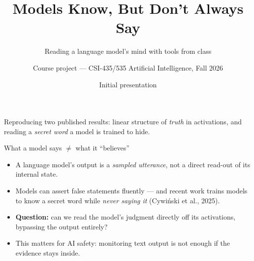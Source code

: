 \documentclass[aspectratio=169,10pt]{beamer}
\title[Models Know, But Don't Always Say]{Models Know, But Don't Always Say}
\subtitle{Reading a language model's mind with tools from class}
\author{Course project --- CSI-435/535 Artificial Intelligence, Fall 2026}
\date{Initial presentation}
\begin{document}
\begin{frame}
  \titlepage
  \begin{center}
    \small Reproducing two published results: linear structure of \emph{truth} in
    activations, and reading a \emph{secret word} a model is trained to hide.
  \end{center}
\end{frame}

\begin{frame}{What a model says $\neq$ what it ``believes''}
  \begin{itemize}
    \item A language model's output is a \emph{sampled utterance}, not a direct
          read-out of its internal state.
    \item Models can assert false statements fluently --- and recent work trains
          models to know a secret word while \emph{never saying it}
          (Cywi\'nski et al., 2025).
    \item \textbf{Question:} can we read the model's judgment directly off its
          activations, bypassing the output entirely?
    \item This matters for AI safety: monitoring text output is not enough if
          the evidence stays inside.
  \end{itemize}
\end{frame}
\end{document}
